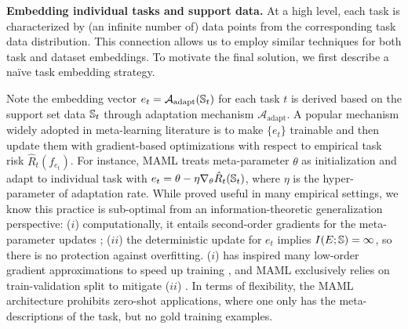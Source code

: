 \documentclass[nohyperref]{article}
\theoremstyle{plain}
\theoremstyle{definition}
\theoremstyle{remark}
\newcommand{\CA}{\mathcal{A}}
\newcommand{\adapt}{\text{adapt}}
\begin{document}
{\bf Embedding individual tasks and support data.} At a high level, each task is characterized by (an infinite number of) data points from the corresponding task data distribution. This connection allows us to employ similar techniques for both task and dataset embeddings. To motivate the final solution, we first describe a na\"ive task embedding strategy. 



Note the embedding vector $e_t=\CA_{\adapt}(\BS_t)$ for each task $t$ is derived based on the support set data $\mathbb{S}_t$ through adaptation mechanism $\CA_{\adapt}$. A popular mechanism widely adopted in meta-learning literature is to make $\{ e_t \}$ trainable and then update them with gradient-based optimizations with respect to empirical task risk $\hat{R}_t(f_{e_t})$. For instance, MAML \citep{finn2017model} treats meta-parameter $\theta$ as initialization and adapt to individual task with $e_t = \theta - \eta \nabla_{\theta} \hat{R}_t(\mathbb{S}_t)$, where $\eta$ is the hyper-parameter of adaptation rate. While proved useful in many empirical settings, we know this practice is sub-optimal from an information-theoretic generalization perspective: ($i$) computationally, it entails second-order gradients for the meta-parameter updates \citep{nichol2018first}; ($ii$) the deterministic update for $e_t$ implies $I(E;\mathbb{S})=\infty$, so there is no protection against overfitting. ($i$) has inspired many low-order gradient approximations to speed up training \citep{rajeswaran2019meta, zhou2021meta}, and MAML exclusively relies on train-validation split to mitigate ($ii$) \citep{bai2021important}. In terms of flexibility, the MAML architecture prohibits zero-shot applications, where one only has the meta-descriptions of the task, but no gold training examples. 
\end{document}
